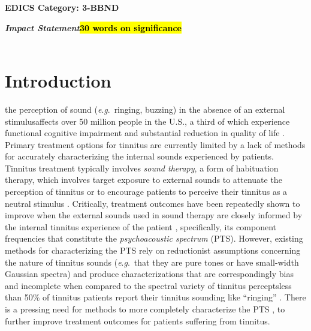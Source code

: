 \documentclass[journal]{IEEEtran}
\newcommand{\eg}{\textit{e}.\textit{g}.\ }
\begin{document}
\ifCLASSOPTIONpeerreview
\begin{center} \bfseries EDICS Category: 3-BBND \end{center}
\fi
%
\IEEEpeerreviewmaketitle

\begin{minipage}[t]{1\columnwidth}
\textbf{\textit{Impact Statement}\textemdash{}\hl{30 words on significance}}\\
\\
\end{minipage}

\section{Introduction}

\textemdash{}the perception of sound (\eg ringing, buzzing)
in the absence of an external stimulus\textemdash{}affects over 50 million people in the U.S.,
a third of which experience functional cognitive impairment and substantial reduction
in quality of life \cite{henryTinnitusEpidemiologicPerspective2020,vajsakovicPrinciplesMethodsPsychoacoustic2021}.
Primary treatment options for tinnitus are currently limited by a lack of methods
for accurately characterizing the internal sounds experienced by patients.
Tinnitus treatment typically involves \textit{sound therapy}, a form of habituation therapy,
which involves target exposure to external sounds to attenuate the perception of tinnitus
or to encourage patients to perceive their tinnitus as a neutral stimulus
\cite{jastreboff25YearsTinnitus2015}.
Critically, treatment outcomes have been repeatedly shown to improve
when the external sounds used in sound therapy are closely informed
by the internal tinnitus experience of the patient
\cite{steinInhibitioninducedPlasticityTinnitus2015,tassCounteractingTinnitusAcoustic2012,okamotoListeningTailormadeNotched2010,davisNeuromonicsTinnitusTreatment2007},
specifically, its component frequencies that constitute
the \textit{psychoacoustic spectrum} (PTS).
However, existing methods for characterizing the PTS rely on reductionist assumptions
concerning the nature of tinnitus sounds (\eg that they are pure tones or have small-width Gaussian spectra)
and produce characterizations that are correspondingly bias and incomplete
when compared to the spectral variety of tinnitus percepts\textemdash{}less than
50\% of tinnitus patients
report their tinnitus sounding like ``ringing'' \cite{vajsakovicPrinciplesMethodsPsychoacoustic2021}.
There is a pressing need for methods to more completely characterize the PTS
\cite{henryTinnitusEpidemiologicPerspective2020,henryMeasurementTinnitus2016,norenaPsychoacousticCharacterizationTinnitus2002},
to further improve treatment outcomes for patients suffering from tinnitus.
\end{document}
